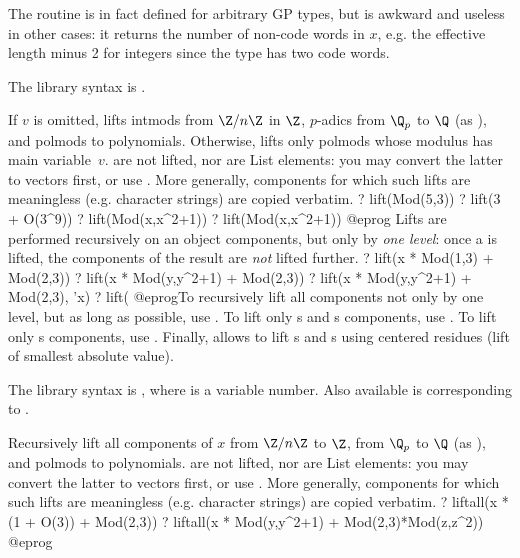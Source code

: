 The routine is in fact defined for arbitrary GP types, but is awkward and
useless in other cases: it returns the number of non-code words in $x$, e.g.
the effective length minus 2 for integers since the  type has two code
words.

The library syntax is .

\label{se:lift}
If $v$ is omitted, lifts intmods from $\Z/n\Z$ in $\Z$,
$p$-adics from $\Q_p$ to $\Q$ (as ), and polmods to
polynomials. Otherwise, lifts only polmods whose modulus has main
variable~$v$.  are not lifted, nor are List elements: you may
convert the latter to vectors first, or use . More
generally, components for which such lifts are meaningless (e.g. character
strings) are copied verbatim.
\bprog
? lift(Mod(5,3))
? lift(3 + O(3^9))
? lift(Mod(x,x^2+1))
? lift(Mod(x,x^2+1))
@eprog
Lifts are performed recursively on an object components, but only
by \emph{one level}: once a  is lifted, the components of
the result are \emph{not} lifted further.
\bprog
? lift(x * Mod(1,3) + Mod(2,3))
? lift(x * Mod(y,y^2+1) + Mod(2,3))
? lift(x * Mod(y,y^2+1) + Mod(2,3), 'x)
? lift(%
@eprog\noindent To recursively lift all components not only by one level,
but as long as possible, use . To lift only s and
s components, use . To lift only s
components, use . Finally,  allows to lift
s and s using centered residues (lift of smallest
absolute value).

The library syntax is , where  is a variable number.
Also available is  corresponding to
.

\label{se:liftall}
Recursively lift all components of $x$ from $\Z/n\Z$ to $\Z$,
from $\Q_p$ to $\Q$ (as ), and polmods to
polynomials.  are not lifted, nor are List elements: you may
convert the latter to vectors first, or use . More
generally, components for which such lifts are meaningless (e.g. character
strings) are copied verbatim.
\bprog
? liftall(x * (1 + O(3)) + Mod(2,3))
? liftall(x * Mod(y,y^2+1) + Mod(2,3)*Mod(z,z^2))
@eprog

